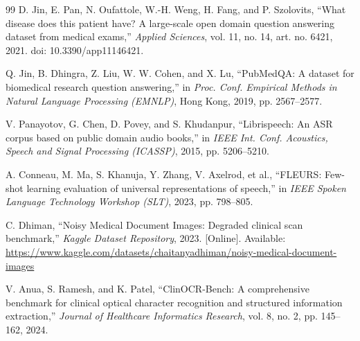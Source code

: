 \documentclass[conference]{IEEEtran}
\begin{document}
\begin{thebibliography}{99}
D. Jin, E. Pan, N. Oufattole, W.-H. Weng, H. Fang, and P. Szolovits,
``What disease does this patient have? A large-scale open domain question answering dataset from medical exams,''
\textit{Applied Sciences}, vol. 11, no. 14, art. no. 6421, 2021.
doi: 10.3390/app11146421.

Q. Jin, B. Dhingra, Z. Liu, W. W. Cohen, and X. Lu,
``PubMedQA: A dataset for biomedical research question answering,''
in \textit{Proc. Conf. Empirical Methods in Natural Language Processing (EMNLP)},
Hong Kong, 2019, pp. 2567--2577.

V. Panayotov, G. Chen, D. Povey, and S. Khudanpur,
``Librispeech: An ASR corpus based on public domain audio books,''
in \textit{IEEE Int. Conf. Acoustics, Speech and Signal Processing (ICASSP)},
2015, pp. 5206--5210.

A. Conneau, M. Ma, S. Khanuja, Y. Zhang, V. Axelrod, et al.,
``FLEURS: Few-shot learning evaluation of universal representations of speech,''
in \textit{IEEE Spoken Language Technology Workshop (SLT)},
2023, pp. 798--805.

C. Dhiman,
``Noisy Medical Document Images: Degraded clinical scan benchmark,''
\textit{Kaggle Dataset Repository}, 2023. [Online].
Available: \url{https://www.kaggle.com/datasets/chaitanyadhiman/noisy-medical-document-images}

V. Anua, S. Ramesh, and K. Patel,
``ClinOCR-Bench: A comprehensive benchmark for clinical optical character recognition and structured information extraction,''
\textit{Journal of Healthcare Informatics Research}, vol. 8, no. 2, pp. 145--162, 2024.

\end{thebibliography}
\end{document}
